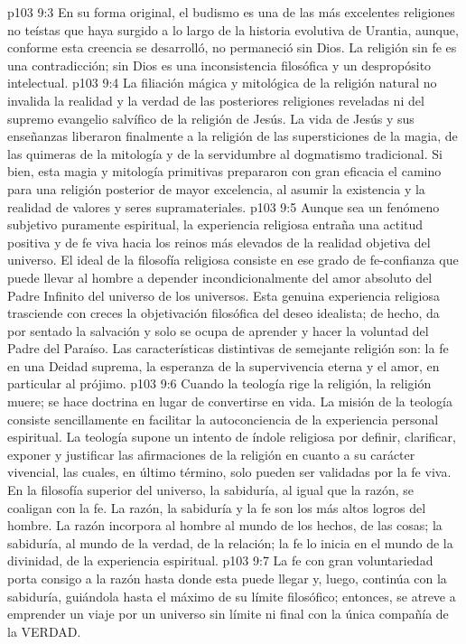 \vs p103 9:3 En su forma original, el budismo es una de las más excelentes religiones no teístas que haya surgido a lo largo de la historia evolutiva de Urantia, aunque, conforme esta creencia se desarrolló, no permaneció sin Dios. La religión sin fe es una contradicción; sin Dios es una inconsistencia filosófica y un despropósito intelectual.
\vs p103 9:4 La filiación mágica y mitológica de la religión natural no invalida la realidad y la verdad de las posteriores religiones reveladas ni del supremo evangelio salvífico de la religión de Jesús. La vida de Jesús y sus enseñanzas liberaron finalmente a la religión de las supersticiones de la magia, de las quimeras de la mitología y de la servidumbre al dogmatismo tradicional. Si bien, esta magia y mitología primitivas prepararon con gran eficacia el camino para una religión posterior de mayor excelencia, al asumir la existencia y la realidad de valores y seres supramateriales.
\vs p103 9:5 Aunque sea un fenómeno subjetivo puramente espiritual, la experiencia religiosa entraña una actitud positiva y de fe viva hacia los reinos más elevados de la realidad objetiva del universo. El ideal de la filosofía religiosa consiste en ese grado de fe\hyp{}confianza que puede llevar al hombre a depender incondicionalmente del amor absoluto del Padre Infinito del universo de los universos. Esta genuina experiencia religiosa trasciende con creces la objetivación filosófica del deseo idealista; de hecho, da por sentado la salvación y solo se ocupa de aprender y hacer la voluntad del Padre del Paraíso. Las características distintivas de semejante religión son: la fe en una Deidad suprema, la esperanza de la supervivencia eterna y el amor, en particular al prójimo.
\vs p103 9:6 \pc Cuando la teología rige la religión, la religión muere; se hace doctrina en lugar de convertirse en vida. La misión de la teología consiste sencillamente en facilitar la autoconciencia de la experiencia personal espiritual. La teología supone un intento de índole religiosa por definir, clarificar, exponer y justificar las afirmaciones de la religión en cuanto a su carácter vivencial, las cuales, en último término, solo pueden ser validadas por la fe viva. En la filosofía superior del universo, la sabiduría, al igual que la razón, se coaligan con la fe. La razón, la sabiduría y la fe son los más altos logros del hombre. La razón incorpora al hombre al mundo de los hechos, de las cosas; la sabiduría, al mundo de la verdad, de la relación; la fe lo inicia en el mundo de la divinidad, de la experiencia espiritual.
\vs p103 9:7 La fe con gran voluntariedad porta consigo a la razón hasta donde esta puede llegar y, luego, continúa con la sabiduría, guiándola hasta el máximo de su límite filosófico; entonces, se atreve a emprender un viaje por un universo sin límite ni final con la única compañía de la VERDAD.
